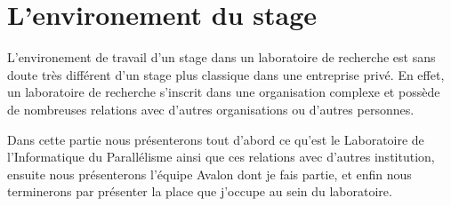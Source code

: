 \newpage
\section{L'environement du stage}
L'environement de travail d'un stage dans un laboratoire de recherche est sans doute très différent d'un stage plus classique dans une entreprise privé. En effet, un laboratoire de recherche s'inscrit dans une organisation complexe et possède de nombreuses relations avec d'autres organisations ou d'autres personnes.

Dans cette partie nous présenterons tout d'abord ce qu'est le Laboratoire de l'Informatique du Parallélisme ainsi que ces relations avec d'autres institution, ensuite nous présenterons l'équipe Avalon dont je fais partie, et enfin nous terminerons par présenter la place que j'occupe au sein du laboratoire.



